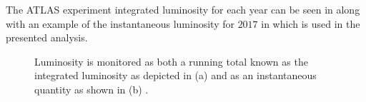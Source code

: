 The ATLAS experiment integrated luminosity for each year can be seen in
 along with an example of the instantaneous luminosity
for $2017$ in  which is used in the presented analysis.

\begin{figure}[!htbp] 
\centering
{}\hfill
{}\hfill
\caption{Luminosity is monitored as both a running total known as the
integrated luminosity as depicted in (a) and as an instantaneous quantity as
shown in (b) \cite{LuminosityPublicResultsRun2}.}
\label{fig:luminosity} 
\end{figure}

